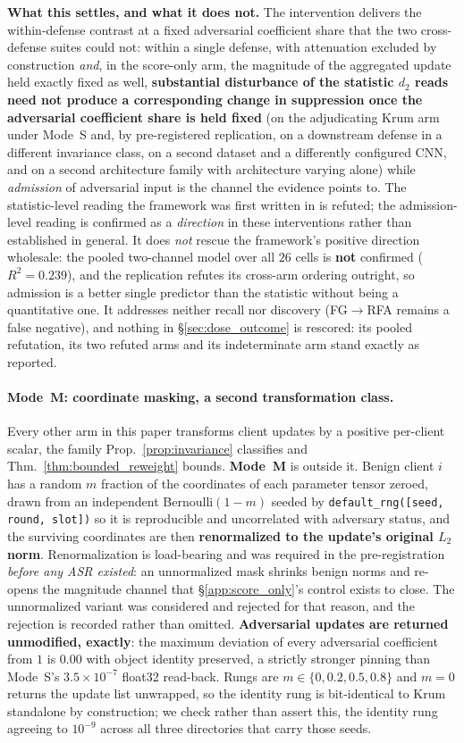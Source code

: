 \documentclass{article}
\begin{document}
\textbf{What this settles, and what it does not.} The intervention delivers the within-defense contrast at a fixed adversarial coefficient share that the two cross-defense suites could not: within a single defense, with attenuation excluded by construction \emph{and}, in the score-only arm, the magnitude of the aggregated update held exactly fixed as well, \textbf{substantial disturbance of the statistic $d_2$ reads need not produce a corresponding change in suppression once the adversarial coefficient share is held fixed} (on the adjudicating Krum arm under Mode~S and, by pre-registered replication, on a downstream defense in a different invariance class, on a second dataset and a differently configured CNN, and on a second architecture family with architecture varying alone) while \emph{admission} of adversarial input is the channel the evidence points to. The statistic-level reading the framework was first written in is refuted; the admission-level reading is confirmed as a \emph{direction} in these interventions rather than established in general. It does \emph{not} rescue the framework's positive direction wholesale: the pooled two-channel model over all $26$ cells is \textbf{not} confirmed ($R^2{=}0.239$), and the replication refutes its cross-arm ordering outright, so admission is a better single predictor than the statistic without being a quantitative one. It addresses neither recall nor discovery (FG$\to$RFA remains a false negative), and nothing in §\ref{sec:dose_outcome} is rescored: its pooled refutation, its two refuted arms and its indeterminate arm stand exactly as reported.
\paragraph{Mode~M: coordinate masking, a second transformation class.} Every other arm in this paper transforms client updates by a positive per-client scalar, the family Prop.~\ref{prop:invariance} classifies and Thm.~\ref{thm:bounded_reweight} bounds. \textbf{Mode~M} is outside it. Benign client $i$ has a random $m$ fraction of the coordinates of each parameter tensor zeroed, drawn from an independent Bernoulli$(1{-}m)$ seeded by \texttt{default\_rng([seed, round, slot])} so it is reproducible and uncorrelated with adversary status, and the surviving coordinates are then \textbf{renormalized to the update's original $L_2$ norm}. Renormalization is load-bearing and was required in the pre-registration \emph{before any ASR existed}: an unnormalized mask shrinks benign norms and re-opens the magnitude channel that §\ref{app:score_only}'s control exists to close. The unnormalized variant was considered and rejected for that reason, and the rejection is recorded rather than omitted. \textbf{Adversarial updates are returned unmodified, exactly}: the maximum deviation of every adversarial coefficient from $1$ is $0.00$ with object identity preserved, a strictly stronger pinning than Mode~S's $3.5{\times}10^{-7}$ float32 read-back. Rungs are $m \in \{0, 0.2, 0.5, 0.8\}$ and $m{=}0$ returns the update list unwrapped, so the identity rung is bit-identical to Krum standalone by construction; we check rather than assert this, the identity rung agreeing to $10^{-9}$ across all three directories that carry those seeds.
\end{document}
